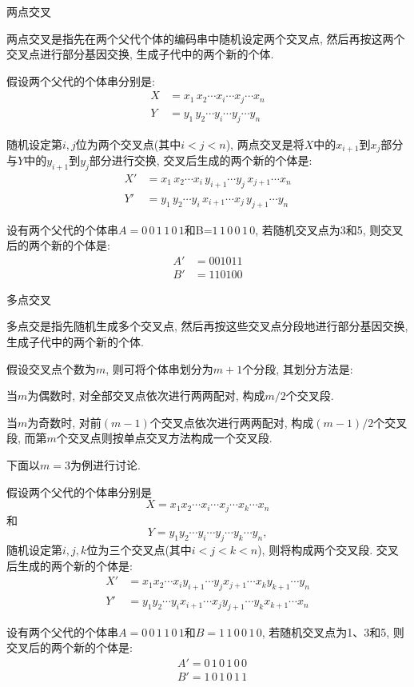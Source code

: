 {     两点交叉

两点交叉是指先在两个父代个体的编码串中随机设定两个交叉点, 然后再按这两个交叉点进行部分基因交换, 生成子代中的两个新的个体.

假设两个父代的个体串分别是:
\begin{align}
    X&=x_1\, x_2 \cdots x_i \cdots x_j \cdots x_n\\
    Y&=y_1\, y_2 \cdots y_i \cdots y_j \cdots y_n
\end{align}

随机设定第$i,j$位为两个交叉点(其中$i<j<n$), 两点交叉是将$X$中的$x_{i+1}$到$x_j$部分与$Y$中的$y_{i+1}$到$y_j$部分进行交换, 交叉后生成的两个新的个体是:
\begin{align}
  X'&= x_1\, x_2 \cdots x_i\, y_{i+1} \cdots y_j\, x_{j+1} \cdots x_n\\
  Y'&= y_1\, y_2  \cdots y_i\, x_{i+1} \cdots x_j\, y_{j+1} \cdots y_n
\end{align}

\begin{example}
设有两个父代的个体串$A= 0\, 0\,  1\,  1\,  0\,  1$和B=$1\,  1\,  0\,  0\,  1\,  0$, 若随机交叉点为3和5, 则交叉后的两个新的个体是:
\begin{align}
  A'&= 0 0 1 0 1 1\\
  B'&= 1 1 0 1 0 0
\end{align}
\end{example}

     多点交叉

多点交是指先随机生成多个交叉点, 然后再按这些交叉点分段地进行部分基因交换, 生成子代中的两个新的个体.

假设交叉点个数为$m$, 则可将个体串划分为$m+1$个分段, 其划分方法是:

当$m$为偶数时, 对全部交叉点依次进行两两配对, 构成$m/2$个交叉段.

当$m$为奇数时, 对前$(m-1)$个交叉点依次进行两两配对, 构成$(m-1)/2$个交叉段, 而第$m$个交叉点则按单点交叉方法构成一个交叉段.

下面以$m=3$为例进行讨论.

假设两个父代的个体串分别是$$X=x_1 x_2 \cdots x_i \cdots x_j \cdots x_k \cdots x_n$$和$$Y=y_1 y_2 \cdots y_i \cdots y_j \cdots y_k \cdots y_n,$$
随机设定第$i,j,k$位为三个交叉点(其中$i<j<k<n$), 则将构成两个交叉段. 交叉后生成的两个新的个体是:
\begin{align}
  X'&= x_1 x_2 \cdots x_i  y_{i+1} \cdots y_j x_{j+1} \cdots x_k y_{k+1} \cdots y_n\\
  Y'&= y_1 y_2 \cdots y_i x_{i+1} \cdots x_j y_{j+1} \cdots y_k x_{k+1} \cdots x_n
\end{align}
\begin{example}
设有两个父代的个体串$A= 0\, 0\, 1\, 1\, 0\, 1$和$B= 1\, 1\, 0\, 0\, 1\, 0$, 若随机交叉点为1、3和5, 则交叉后的两个新的个体是:
\begin{align}
   &A'= 0\, 1\, 0\, 1\, 0\, 0\\
   &B'= 1\, 0\, 1\, 0\, 1\, 1
\end{align}
\end{example}

}
